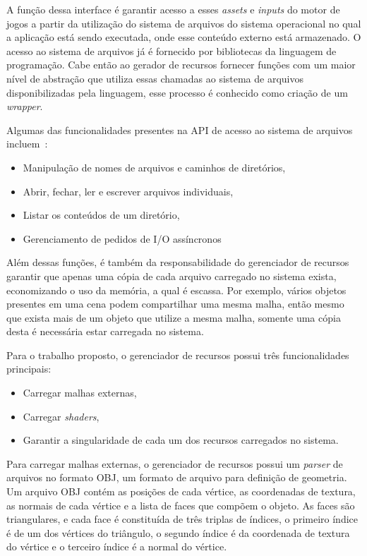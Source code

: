 A função dessa interface é garantir acesso a esses \textit{assets} e \textit{inputs} 
do motor de jogos a partir da utilização do sistema de arquivos do sistema operacional 
no qual a aplicação está sendo executada, onde esse conteúdo externo está armazenado. 
O acesso ao sistema de arquivos já é fornecido por bibliotecas da linguagem de 
programação. Cabe então ao gerador de recursos fornecer funções com um maior nível de 
abstração que utiliza essas chamadas ao sistema de arquivos disponibilizadas pela 
linguagem, esse processo é conhecido como criação de um \textit{wrapper}. 

Algumas das funcionalidades presentes na API de acesso ao sistema de arquivos 
incluem~\cite{gregory2009game}:
\begin{itemize}
    \item Manipulação de nomes de arquivos e caminhos de diretórios,
    \item Abrir, fechar, ler e escrever arquivos individuais,
    \item Listar os conteúdos de um diretório,
    \item Gerenciamento de pedidos de I/O assíncronos
\end{itemize}

Além dessas funções, é também da responsabilidade do gerenciador de recursos garantir 
que apenas uma cópia de cada arquivo carregado no sistema exista, economizando o uso 
da memória, a qual é escassa. Por exemplo, vários objetos presentes em uma cena podem 
compartilhar uma mesma malha, então mesmo que exista mais de um objeto que utilize a 
mesma malha, somente uma cópia desta é necessária estar carregada no sistema.

Para o trabalho proposto, o gerenciador de recursos possui três funcionalidades 
principais:
\begin{itemize}
    \item Carregar malhas externas,
    \item Carregar \textit{shaders},
    \item Garantir a singularidade de cada um dos recursos carregados no sistema.
\end{itemize}

Para carregar malhas externas, o gerenciador de recursos possui um \textit{parser} 
de arquivos no formato OBJ, um formato de arquivo para definição de geometria. Um 
arquivo OBJ contém as posições de cada vértice, as coordenadas de textura, as normais 
de cada vértice e a lista de faces que compõem o objeto. As faces são triangulares, e 
cada face é constituída de três triplas de índices, o primeiro índice é de um dos 
vértices do triângulo, o segundo índice é da coordenada de textura do vértice e o 
terceiro índice é a normal do vértice.

